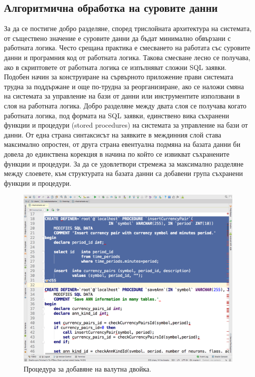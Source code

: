 \documentclass[book,14pt,oneside,openany]{memoir}
\begin{document}
\subsection{Алгоритмична обработка на суровите данни}

За да се постигне добро разделяне, според трислойната архитектура на системата, от съществено значение е суровите данни да бъдат минимално обвързани с работната логика. Често срещана практика е смесването на работата със суровите данни и програмния код от работната логика. Такова смесване лесно се получава, ако в скриптовете от работната логика се изпълняват сложни SQL заявки. Подобен начин за конструиране на сървърното приложение прави системата трудна за поддържане и още по-трудна за реорганизиране, ако се наложи смяна на системата за управление на бази от данни или инструментите използвани в слоя на работната логика. Добро разделяне между двата слоя се получава когато работната логика, под формата на SQL заявки, единствено вика съхранени функции и процедури (stored procedures) на системата за управление на бази от данни. От една страна синтаксисът на заявките в междинния слой става максимално опростен, от друга страна евентуална подмяна на базата данни би довела до единствена корекция в начина по който се извикват съхранените функции и процедури. За да се удовлетвори стремежа за максимално разделяне между слоевете, към структурата на базата данни са добавени група съхранени функции и процедури. 

\begin{figure}[h]
  \centering
  \includegraphics[height=0.45\pdfpageheight]{pic0104}
  \caption{Процедура за добавяне на валутна двойка.}
\label{fig:pic0104}
\end{figure}
\FloatBarrier
\end{document}
